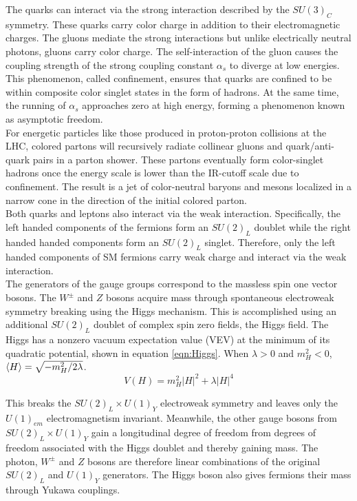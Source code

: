 \indent The quarks can interact via the strong interaction described by the $SU(3)_C$ symmetry.  These quarks carry color charge in addition to their electromagnetic charges.  The gluons mediate the strong interactions but unlike electrically neutral photons, gluons carry color charge.  The self-interaction of the gluon causes the coupling strength of the strong coupling constant $\alpha_s$ to diverge at low energies.  This phenomenon, called confinement, ensures that quarks are confined to be within composite color singlet states in the form of hadrons.  At the same time, the running of $\alpha_s$ approaches zero at high energy, forming a phenomenon known as asymptotic freedom. \\

\indent For energetic particles like those produced in proton-proton collisions at the LHC, colored partons will recursively radiate collinear gluons and quark/anti-quark pairs in a parton shower. These partons eventually form color-singlet hadrons once the energy scale is lower than the IR-cutoff scale due to confinement.  The result is a jet of color-neutral baryons and mesons localized in a narrow cone in the direction of the initial colored parton. \\

\indent Both quarks and leptons also interact via the weak interaction.  Specifically, the left handed components of the fermions form an $SU(2)_L$ doublet while the right handed handed components form an $SU(2)_L$ singlet.  Therefore, only the left handed components of SM fermions carry weak charge and interact via the weak interaction.  \\

\indent The generators of the gauge groups correspond to the massless spin one vector bosons.  The $W^\pm$ and $Z$ bosons acquire mass through spontaneous electroweak symmetry breaking using the Higgs mechanism.  This is accomplished using an additional $SU(2)_L$ doublet of complex spin zero fields, the Higgs field.  The Higgs has a nonzero vacuum expectation value (VEV) at the minimum of its quadratic potential, shown in equation \ref{eqn:Higgs}.  When $\lambda > 0$ and $m_H^2 < 0 $, $\braket{H} = \sqrt{-m_H^2/2\lambda}$.  \\

\begin{equation}
\label{eqn:Higgs}
V(H) = m_H^2 |H|^2 +\lambda |H|^4
\end{equation}

\indent This breaks the $SU(2)_L \times U(1)_Y$ electroweak symmetry and leaves only the $U(1)_{em}$ electromagnetism invariant.  Meanwhile, the other gauge bosons from $SU(2)_L \times U(1)_Y$ gain a longitudinal degree of freedom from degrees of freedom associated with the Higgs doublet and thereby gaining mass.  The photon, $W^\pm$ and $Z$ bosons are therefore linear combinations of the original $SU(2)_L$ and $U(1)_Y$ generators.  The Higgs boson also gives fermions their mass through Yukawa couplings. \\

